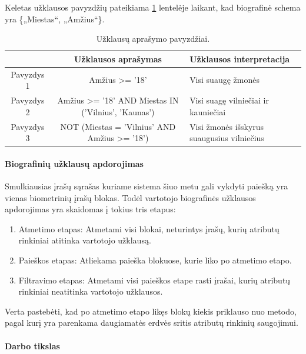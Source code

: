 Keletas užklausos pavyzdžių pateikiama \ref{tab:queryExamples} lentelėje laikant, kad biografinė schema yra \{„Miestas“, „Amžius“\}.

\begin{table}[H]\footnotesize
	\centering
	\begin{tabular}{|c|c|l|}
		\hline
		& {\bf Užklausos aprašymas} & {\bf Užklausos interpretacija} \\
		\hline
		Pavyzdys 1 & Amžius >= '18' & Visi suaugę žmonės\\
		\hline
		Pavyzdys 2 & Amžius >= '18' AND Miestas IN ('Vilnius', 'Kaunas') & Visi suagę vilniečiai ir kauniečiai\\
		\hline
		Pavyzdys 3 & NOT (Miestas = 'Vilnius' AND Amžius >= '18') & Visi žmonės išskyrus suaugusius vilniečius\\
		\hline
	\end{tabular}
	\caption{Užklausų aprašymo pavyzdžiai.}
	\label{tab:queryExamples}
\end{table}



\paragraph{Biografinių užklausų apdorojimas}

Smulkiausias įrašų sąrašas kuriame sistema \cite{NeurotechnologyMegamatcherAccelerator} šiuo metu gali vykdyti paiešką yra vienas biometrinių įrašų blokas.
Todėl vartotojo biografinės užklausos apdorojimas yra skaidomas į tokius tris etapus:
\begin{enumerate}
	\item Atmetimo etapas: Atmetami visi blokai, neturintys įrašų, kurių atributų rinkiniai atitinka vartotojo užklausą.
	\item Paieškos etapas: Atliekama paieška blokuose, kurie liko po atmetimo etapo.
	\item Filtravimo etapas: Atmetami visi paieškos etape rasti įrašai, kurių atributų rinkiniai neatitinka vartotojo užklausos.
\end{enumerate}

Verta pastebėti, kad po atmetimo etapo likęs blokų kiekis priklauso nuo metodo, pagal kurį yra parenkama daugiamatės erdvės sritis atributų rinkinių saugojimui.



\paragraph{Darbo tikslas}

